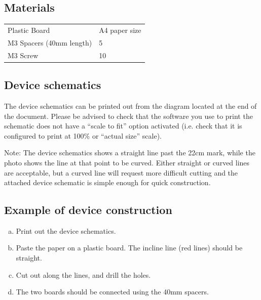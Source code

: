 \documentclass{article}
\begin{document}
\subsection{Materials}

\begin{table}
\begin{tabularx}{\textwidth}{
p{}
p{}}
Plastic Board & A4 paper size \\
M3 Spacers (40mm length) & 5 \\
M3 Screw & 10 \\

\end{tabularx}

\end{table}

\subsection{Device schematics}

The device schematics can be printed out from the diagram located at the end of
the document. Please be advised to check that the software you use to print the
schematic does not have a ``scale to fit'' option activated (i.e. check that it
is configured to print at 100\% or ``actual size'' scale).

Note: The device schematics shows a straight line past the 22cm mark, while the
photo shows the line at that point to be curved. Either straight or curved
lines are acceptable, but a curved line will request more difficult cutting and
the attached device schematic is simple enough for quick construction.

\subsection{Example of device construction}

\begin{enumerate}[a.]
    \item Print out the device schematics.
    \item Paste the paper on a plastic board. The incline line (red lines) should be straight.
    \item Cut out along the lines, and drill the holes.
    \item The two boards should be connected using the 40mm spacers.
\end{enumerate}
\end{document}
